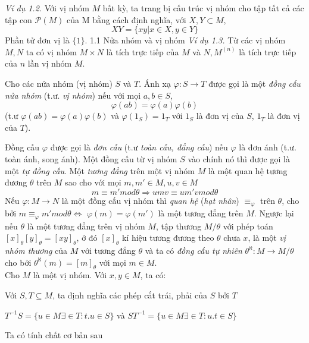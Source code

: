 \textit{Ví dụ 1.2.}
    Với vị nhóm $M$ bất kỳ, ta trang bị cấu trúc vị nhóm cho tập tất cả các tập con $\mathcal{P}(M)$ của M bằng cách định nghĩa, với $X, Y \subset M$,
    $$
        XY = \{ xy | x \in X, y \in Y \}
    $$
    Phần tử đơn vị là $\{1\}$.
1.1 Nửa nhóm và vị nhóm
\textit{Ví dụ 1.3.} 
    Từ các vị nhóm $M, N$ ta có vị nhóm $M \times N$ là tích trực tiếp của $M$ và $N, M^{(n)}$ là tích trực tiếp của $n$ lần vị nhóm $M$.

    Cho các nửa nhóm (vị nhóm) $S$ và $T$. Ánh xạ $\varphi : S \rightarrow T$ được gọi là một {\it đồng cấu nửa nhóm} (t.ư. {\it vị nhóm}) nếu với mọi $a, b \in S$,
    $$
    \varphi(ab) = \varphi(a)\varphi(b)
    $$
    (t.ư $\varphi(ab) = \varphi(a)\varphi(b)$ và $\varphi(1_S) = 1_T$ với $1_S$ là đơn vị của $S$, $1_T$ là đơn vị của $T$).

    Đồng cấu $\varphi$ được gọi là {\it đơn cấu} (t.ư {\it toàn cấu, đẳng cấu}) nếu $\varphi$ là đơn ánh (t.ư. toàn ánh, song ánh). 
    Một đồng cấu từ vị nhóm $S$ vào chính nó thì được gọi là một {\it tự đồng cấu}.
    Một {\it tương đẳng} trên một vị nhóm $M$ là một quan hệ tương đương ${\theta}$ trên $M$ sao cho với mọi $m,m' \in M, u,v \in M$
    $$
    m \equiv m'mod\theta \Rightarrow umv \equiv um'vmod\theta 
    $$
    \hspace{10mm} Nếu $\varphi : M \to N$ là một đồng cấu vị nhóm thì {\it quan hệ} ({\it hạt nhân}) $\equiv_\varphi$ trên $\theta$, cho bởi $m \equiv_\varphi m'mod\theta {\Leftrightarrow}$ $\varphi(m) = \varphi(m')$ là một tương đẳng trên $M$. Ngược lại nếu $\theta$ là một tương đẳng trên vị nhóm $M$, tập thương $M/\theta$ với phép toán $[x]_\theta[y]_\theta = [xy]_\theta$, ở đó $[x]_\theta$ kí hiệu tương đương theo $\theta$ chưa $x$, là một {\it vị nhóm thương} của $M$ với tương đẳng $\theta$ và ta có {\it đồng cấu tự nhiên} $\theta^\aleph : M \to M/\theta$ cho bởi $\theta^\aleph(m) = [m]_\theta$ với mọi $m \in M$.\\
    Cho $M$ là một vị nhóm. Với $x, y \in M$, ta có: 
    \\
    \begin{flushleft}
    \hspace{10mm} Với $S, T \subseteq M$, ta định nghĩa các phép cắt trái, phải của $S$ bởi $T$
    \end{flushleft}
    $
    T^{-1}S = \{u \in M \exists \in T : t.u \in S \}$ và $ST^{-1} = \{ u \in M \exists \in T : u.t \in S \}
    $
    \begin{flushleft}
    \hspace{10mm}Ta có tính chất cơ bản sau
    \end{flushleft}
